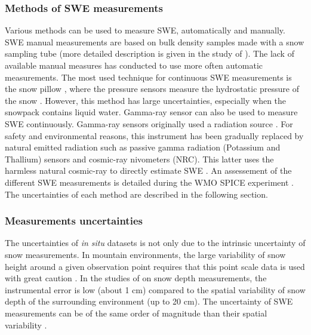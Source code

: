 \documentclass[hydrology,article,submit,moreauthors,pdftex]{Definitions/mdpi}
\begin{document}

\subsubsection{Methods of SWE measurements}
Various methods can be used to measure SWE, automatically and manually. SWE manual measurements are based on bulk density samples made with a snow sampling tube (more detailed description is given in the study of \citet{Leppanen_2016}). The lack of available manual measures has conducted to use more often automatic measurements.
The most used technique for continuous SWE measurements is the snow pillow \citep{Serreze_1999,Smith_2017}, where the pressure sensors measure the hydrostatic pressure of the snow \citep{Beaumont_1965}. However, this method has large uncertainties, especially when the snowpack contains liquid water. Gamma-ray sensor can also be used to measure SWE continuously. Gamma-ray sensors originally used a radiation source \citep{Harding_1986}. For safety and environmental reasons, this instrument has been gradually replaced by natural emitted radiation such as passive gamma radiation (Potassium and Thallium) sensors and cosmic-ray nivometers (NRC). This latter uses the harmless natural cosmic-ray to directly estimate SWE \citep{Choquette_2008,Martin_2008}. An assessement of the different SWE measurements is detailed during the WMO SPICE experiment \citep{Smith_2017}. The uncertainties of each method are described in the following section.



\subsubsection{Measurements uncertainties}

The uncertainties of \textit{in situ} datasets is not only due to the intrinsic uncertainty of snow measurements. In mountain environments, the large variability of snow height around a given observation point requires that this point scale data is used with great caution \citep{Grunewald_2013}. 
In the studies of \citet{Lafaysse_2017} on snow depth measurements, the instrumental error is low (about 1 cm) compared to the spatial variability of snow depth of the surrounding environment (up to 20 cm). The uncertainty of SWE measurements can be of the same order of magnitude than their spatial variability \citep{Smith_2017,Lafaysse_2017}. 
\end{document}
